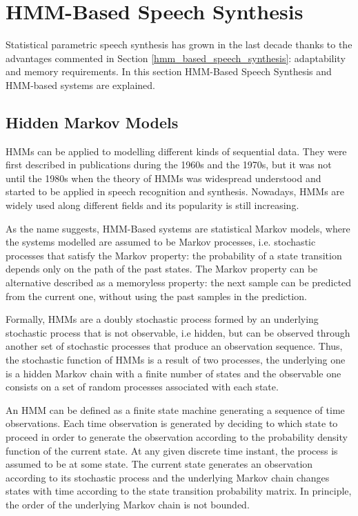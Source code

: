 \section{HMM-Based Speech Synthesis}
\label{hmm_synthesis}
Statistical parametric speech synthesis has grown in the last decade thanks to the advantages commented in Section \ref{hmm_based_speech_synthesis}: adaptability and memory requirements. In this section HMM-Based Speech Synthesis and HMM-based systems are explained.

\subsection{Hidden Markov Models}
\label{hmm_syntheis_markov}
HMMs can be applied to modelling different kinds of sequential data.
%
They were first described in publications during the 1960s and the 1970s, but it was not until the 1980s when the theory of HMMs was widespread understood and started to be applied in speech recognition and synthesis.
%
Nowadays, HMMs are widely used along different fields and its popularity is still increasing.

As the name suggests, HMM-Based systems are statistical Markov models, where the systems modelled are assumed to be Markov processes, i.e. stochastic processes that satisfy the Markov property: the probability of a state transition depends only on the path of the past states.
%
The Markov property can be alternative described as a memoryless property: the next sample can be predicted from the current one, without using the past samples in the prediction.

Formally, HMMs are a doubly stochastic process formed by an underlying stochastic process that is not observable, i.e hidden, but can be observed through another set of stochastic processes that produce an observation sequence. 
%
Thus, the stochastic function of HMMs is a result of two processes, the underlying one is a hidden Markov chain with a finite number of states and the observable one consists on a set of random processes associated with each state.

An HMM can be defined as a finite state machine generating a sequence of time observations.
%
Each time observation is generated by deciding to which state to proceed in order to generate the observation according to the probability density function of the current state.
%
At any given discrete time instant, the process is assumed to be at some state.
%
The current state generates an observation according to its stochastic process and the underlying Markov chain changes states with time according to the state transition probability matrix. 
%
In principle, the order of the underlying Markov chain is not bounded.

